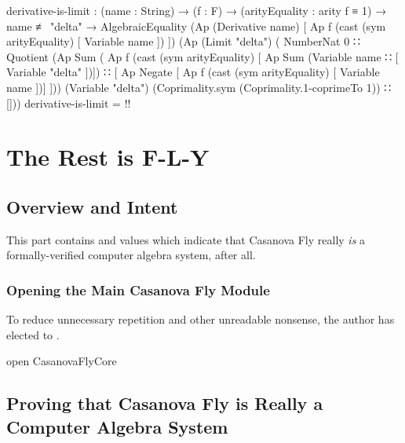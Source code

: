 \documentclass{report}
\begin{document}
\begin{code}
    derivative-is-limit :
      (name : String) →
      (f : F) →
      (arityEquality : arity f ≡ 1) →
      name ≢ "delta" →
      AlgebraicEquality
        (Ap (Derivative name) [ Ap f (cast (sym arityEquality) [ Variable name ]) ])
        (Ap (Limit "delta")
            ( NumberNat 0
            ∷ Quotient
                (Ap Sum ( Ap f (cast (sym arityEquality)
                                     [ Ap Sum (Variable name ∷ [ Variable "delta" ])])
                        ∷ [ Ap Negate [ Ap f (cast (sym arityEquality) [ Variable name ])] ]))
                (Variable "delta")
                (Coprimality.sym (Coprimality.1-coprimeTo 1))
            ∷ []))
    derivative-is-limit = {!!}
\end{code}

\part{The Rest is F-L-Y}

\chapter{Overview and Intent}
This part contains  and  values which indicate that Casanova Fly really \emph{is} a formally-verified computer algebra system, after all.

\section{Opening the Main Casanova Fly Module}
To reduce unnecessary repetition and other unreadable nonsense, the author has elected to  .

\begin{code}
open CasanovaFlyCore
\end{code}

\chapter{Proving that Casanova Fly is Really a Computer Algebra System}
\end{document}
